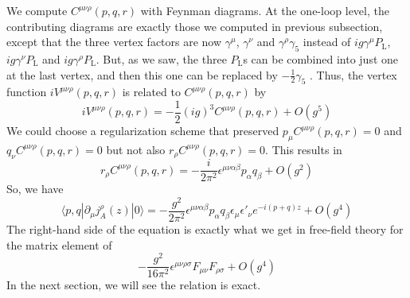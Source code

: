 We compute $C^{\mu\nu\rho}(p,q,r)$ with Feynman diagrams. At the one-loop level, the contributing diagrams are exactly those we computed in previous subsection, except that the three vertex factors are now $\gamma^{\mu}$, $\gamma^{\nu}$ and $\gamma^{\rho}\gamma_5$ instead of $ig\gamma^{\mu}P_{\mathrm{L}}$, $ig\gamma^{\nu}P_{\mathrm{L}}$ and $ig\gamma^{\rho}P_{\mathrm{L}}$. But, as we saw, the three $P_{\mathrm{L}}$s can be combined into just one at the last vertex, and then this one can be replaced by $-\frac{1}{2}\gamma_5$ . Thus, the vertex function $iV^{\mu\nu\rho}(p,q,r)$ is related to $C^{\mu\nu\rho}(p,q,r)$ by
\[iV^{\mu\nu\rho}(p,q,r) = -\frac{1}{2}(ig)^3 C^{\mu\nu\rho}(p,q,r) + O(g^5)\]
We could choose a regularization scheme that
preserved $p_{\mu}C^{\mu\nu\rho}(p,q,r) = 0$ and $q_{\nu}C^{\mu\nu\rho}(p,q,r) = 0$ but not also $r_{\rho}C^{\mu\nu\rho}(p,q,r) = 0$. This results in
\[r_{\rho}C^{\mu\nu\rho}(p,q,r) = -\frac{i}{2\pi^2} \epsilon^{\mu\nu\alpha\beta} p_{\alpha} q_{\beta} + O(g^2)\]
So, we have
\[\langle p,q | \partial_{\mu} j^{\rho}_A(z) |  0 \rangle  = - \frac{g^2}{2\pi^2} \epsilon^{\mu\nu\alpha\beta} p_{\alpha} q_{\beta} \epsilon_{\mu} \epsilon'_{\nu} e^{-i(p+q)z} + O(g^4) \]
The right-hand side of the equation is exactly what we get in free-field theory for the matrix element of
\[- \frac{g^2}{16\pi^2} \epsilon^{\mu\nu\rho\sigma}F_{\mu\nu}F_{\rho\sigma} + O(g^4) \]
In the next section, we will see the relation is exact.

